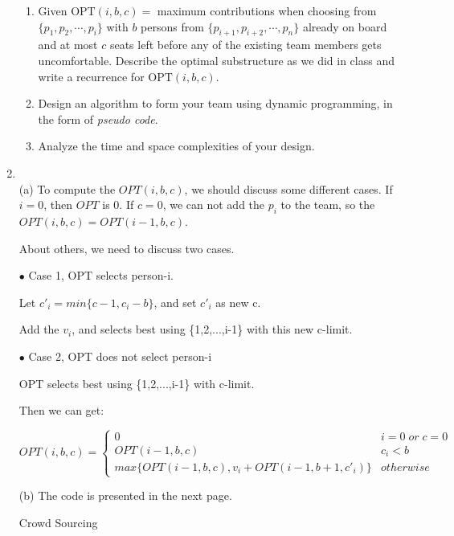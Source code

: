 \documentclass[12pt,a4paper]{article}
\makeatletter
\newtheorem*{solution}{Solution}
\theoremstyle{definition}
\renewenvironment{solution}[1][Solution] {\par\pushQED{\qed}\normalfont\topsep6\p@\@plus6\p@\relax\trivlist\item[\hskip\labelsep\bfseries#1\@addpunct{.}]\ignorespaces}{\popQED\endtrivlist\@endpefalse} \makeatother
\makeatother
\begin{document}
\begin{enumerate}
	\begin{enumerate}
		\item Given $\text{OPT}(i, b, c)=$ maximum contributions when choosing from $\{p_1, p_2, \cdots, p_i\}$ with $b$ persons from $\{p_{i+1}, p_{i+2}, \cdots, p_n\}$ already on board and at most $c$ seats left before any of the existing team members gets uncomfortable. Describe the optimal substructure as we did in class and write a recurrence for $\text{OPT}(i, b, c)$.
		\item Design an algorithm to form your team using dynamic programming, in the form of \emph{pseudo code}.
        \item Analyze the time and space complexities of your design.
	\end{enumerate}
  
  \begin{solution}
  	~\\
  	(a) To compute the $OPT(i,b,c)$, we should discuss some different cases. If $i=0$, then $OPT$ is 0. If $c=0$, we can not add the $p_i$ to the team, so the $OPT(i,b,c)=OPT(i-1,b,c)$.
  	
  	About others, we need to discuss two cases. 
  	
    $\bullet$ Case 1, OPT selects person-i.
    
    Let $c'_i=min\{c-1,c_i-b\}$, and set $c'_i$ as new c.
    
    Add the $v_i$, and selects best using \{1,2,...,i-1\} with this new c-limit.
  	
  $\bullet$ Case 2, OPT does not select person-i
  	
  	OPT selects best using \{1,2,...,i-1\} with  c-limit.
  	
  	
 
  Then we can get:
  
  $OPT(i,b,c)=	\left\{\begin{array}{lcl} 
  		0 & i=0 \;or\; c=0 \\
  		OPT(i-1,b,c) & c_i<b\\
  		max \{ OPT(i-1,b,c),v_i+OPT(i-1,b+1,c'_i)\} & otherwise
  		
  	\end{array} \right. $
 
  	
  
  	
  	
  	(b) The code is presented in the next page.
  		
  	\begin{minipage}{0.9\textwidth}
  		\begin{algorithm}[H]
  			\BlankLine
  			\caption{Crowd Sourcing}
  			

\end{algorithm}
\end{minipage}
\end{solution}
\end{enumerate}
\end{document}
